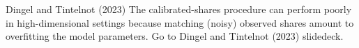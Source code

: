\documentclass[11pt,notes=hide,aspectratio=169]{beamer}
\begin{document}
\begin{frame}{Dingel and Tintelnot (2023)}
The calibrated-shares procedure can perform poorly in high-dimensional settings because matching (noisy) observed shares amount to overfitting the model parameters.
Go to Dingel and Tintelnot (2023) slidedeck.
\end{frame}
\end{document}
